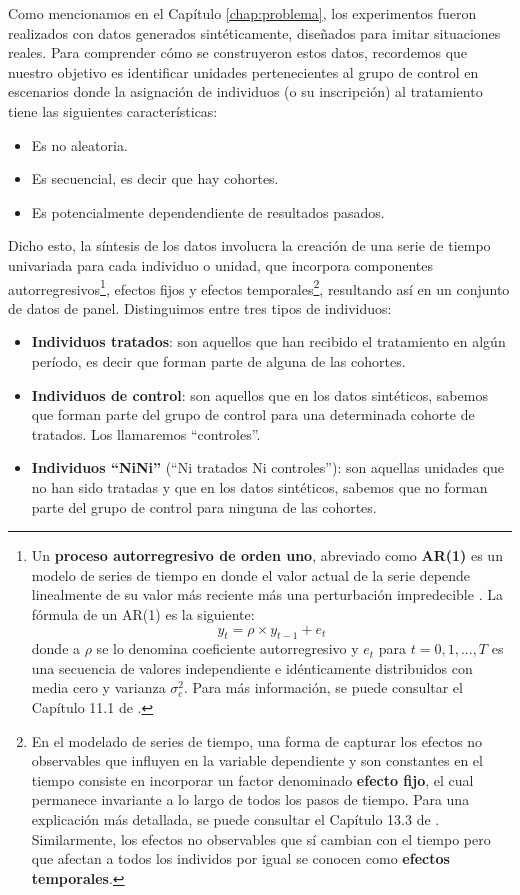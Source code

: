 \documentclass[../../main.tex]{subfiles}
\begin{document}
Como mencionamos en el Capítulo \ref{chap:problema}, los experimentos fueron realizados con
datos generados sintéticamente, diseñados para imitar situaciones reales. Para comprender
cómo se construyeron estos datos, recordemos que nuestro objetivo es identificar
unidades pertenecientes al grupo de control en escenarios donde la asignación de
individuos (o su inscripción) al tratamiento tiene las siguientes características:
\begin{itemize}[itemsep=0.05cm]
    \item Es no aleatoria.
    \item Es secuencial, es decir que hay cohortes.
    \item Es potencialmente dependendiente de resultados pasados.
\end{itemize}

Dicho esto, la síntesis de los datos involucra la creación de una serie de tiempo
univariada para cada individuo o unidad, que incorpora componentes autorregresivos\footnote{Un
\textbf{proceso autorregresivo de orden uno}, abreviado como \textbf{AR(1)} es un modelo
de series de tiempo en donde el valor actual de la serie depende linealmente de su valor
más reciente más una perturbación impredecible \cite{intro-econometria-wooldridge}. La
fórmula de un AR(1) es la siguiente:
\[
    y_t = \rho \times y_{t-1} + e_t
\]
donde a \(\rho\) se lo denomina coeficiente autorregresivo y \(e_t\) para \(t=0,1,...,T\)
es una secuencia de valores independiente e idénticamente distribuidos con media cero y
varianza \(\sigma_e^2\). Para más información, se puede consultar el Capítulo 11.1 de
\cite{intro-econometria-wooldridge}.}, efectos fijos y efectos temporales\footnote{En el
modelado de series de tiempo, una forma de capturar los efectos no observables que
influyen en la variable dependiente y son constantes en el tiempo consiste en incorporar
un factor denominado \textbf{efecto fijo}, el cual permanece invariante a lo largo de
todos los pasos de tiempo. Para una explicación más detallada, se puede consultar el
Capítulo 13.3 de \cite{intro-econometria-wooldridge}. Similarmente, los efectos no
observables que sí cambian con el tiempo pero que afectan a todos los individos por igual
se conocen como \textbf{efectos temporales}.}, resultando así en un conjunto de datos
de panel. Distinguimos entre tres tipos de individuos:

\begin{itemize}[itemsep=0.1cm]
    \item \textbf{Individuos tratados}: son aquellos que han recibido el tratamiento en
    algún período, es decir que forman parte de alguna de las cohortes.
    \item \textbf{Individuos de control}: son aquellos que en los datos sintéticos,
    sabemos que forman parte del grupo de control para una determinada cohorte de
    tratados. Los llamaremos ``controles''.
    \item \textbf{Individuos ``NiNi''} (``Ni tratados Ni controles''): son aquellas
    unidades que no han sido tratadas y que en los datos sintéticos, sabemos que no forman
    parte del grupo de control para ninguna de las cohortes.
\end{itemize}
\end{document}
